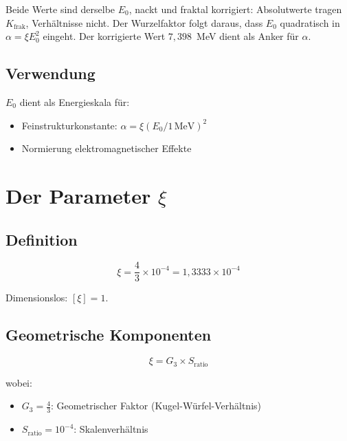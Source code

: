 	Beide Werte sind derselbe $E_0$, nackt und fraktal korrigiert: Absolutwerte tragen $K_{\text{frak}}$, Verhältnisse nicht. Der Wurzelfaktor folgt daraus, dass $E_0$ quadratisch in $\alpha = \xi E_0^2$ eingeht. Der korrigierte Wert $7{,}398$~MeV dient als Anker für $\alpha$.

	\subsection{Verwendung}
	
	$E_0$ dient als Energieskala für:
	\begin{itemize}
		\item Feinstrukturkonstante: $\alpha = \xi (E_0/1\,\text{MeV})^2$
		\item Normierung elektromagnetischer Effekte
	\end{itemize}
	
	\section{Der Parameter $\xi$}
	\label{sec:xi_parameter}
	
	\subsection{Definition}
	
	\begin{equation}
		\boxed{\xi = \frac{4}{3} \times 10^{-4} = 1{,}3333 \times 10^{-4}}
	\end{equation}
	
	Dimensionslos: $[\xi] = 1$.
	
	\subsection{Geometrische Komponenten}
	
	\begin{equation}
		\xi = G_3 \times S_{\text{ratio}}
	\end{equation}
	
	wobei:
	\begin{itemize}
		\item $G_3 = \frac{4}{3}$: Geometrischer Faktor (Kugel-Würfel-Verhältnis)
		\item $S_{\text{ratio}} = 10^{-4}$: Skalenverhältnis
	\end{itemize}
	
